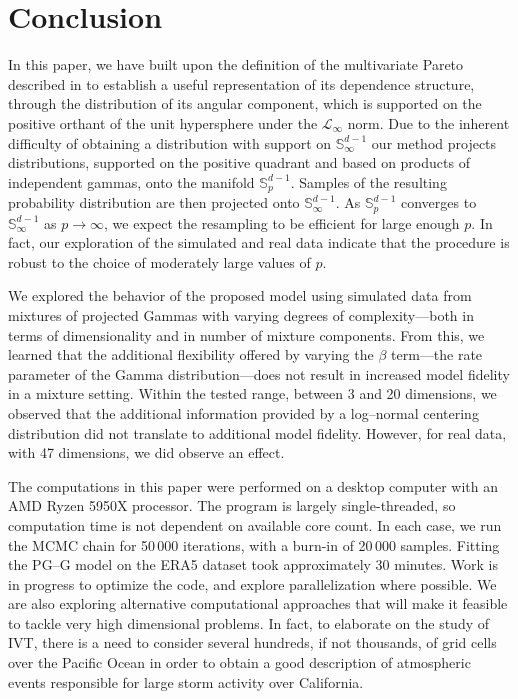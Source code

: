 \section{Conclusion\label{sec:conclusion}}
In this paper, we have built upon the definition of the multivariate Pareto described in \cite{ferreira2014}
  to establish a useful representation of its dependence structure, through
  the distribution of its angular component, which is supported on the positive orthant of the unit
  hypersphere under the $\mathcal{L}_{\infty}$ norm.  Due to the 
  inherent difficulty of obtaining a distribution with support on ${\mathbb S}^{d-1}_\infty$
  our method projects distributions, supported on the positive quadrant and
  based on products of independent gammas,  onto the manifold
  ${\mathbb S}_{p}^{d-1}$. Samples of the resulting probability distribution 
  are then projected onto ${\mathbb S}_{\infty}^{d-1}$.  
  As ${\mathbb S}_{p}^{d-1}$ converges to ${\mathbb S}_{\infty}^{d-1}$ as $
  p\to\infty$, we expect the resampling to be efficient for large enough
  $p$. In fact, our exploration of the simulated and real data indicate
  that the procedure is robust to the choice of moderately large values
  of $p$. 
 
We explored the behavior of the proposed model using simulated data from
    mixtures of projected Gammas with varying degrees of complexity---both in terms of dimensionality and 
    in number of mixture components.  From this, we learned that the additional flexibility 
    offered by varying the $\beta$ term---the rate parameter of the Gamma distribution---does not result 
    in increased model fidelity in a mixture setting.  Within the tested range, between 3 and 20 
    dimensions, we observed that the additional information provided by a log--normal 
    centering distribution did not translate to additional model fidelity.  However, for 
    real data, with 47 dimensions, we did observe an effect.
    
The computations in this paper were performed on a desktop computer with an AMD Ryzen 5950X processor.
  The program is largely single-threaded, so computation time is not dependent on available core count.  In each
  case, we run the MCMC chain for 50\,000 iterations, with a burn-in of 20\,000 samples.  Fitting the PG--G model
  on the ERA5 dataset took approximately 30 minutes.  Work is in progress to optimize the code, and explore
  parallelization where possible.  We are also exploring alternative computational approaches that will make it
  feasible to tackle very high dimensional problems. In fact, to elaborate on the study of IVT, there is a need 
  to consider several hundreds, if not thousands, of grid cells over the Pacific Ocean in order to obtain a 
  good description of atmospheric events responsible for large storm activity over California.


